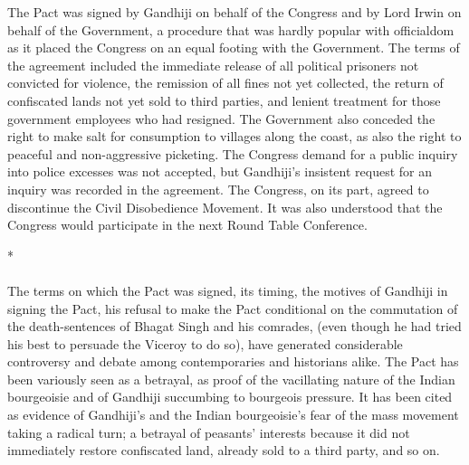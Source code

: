 \begin{multicols}{2}
The Pact was signed by Gandhiji on behalf of the Congress and by Lord Irwin on behalf of the Government, a procedure that was hardly popular with officialdom as it placed the Congress on an equal footing with the Government. The terms of the agreement included the immediate release of all political prisoners not convicted for violence, the remission of all fines not yet collected, the return of confiscated lands not yet sold to third parties, and lenient treatment for those government employees who had resigned. The Government also conceded the right to make salt for consumption to villages along the coast, as also the right to peaceful and non-aggressive picketing. The Congress demand for a public inquiry into police excesses was not accepted, but Gandhiji's insistent request for an inquiry was recorded in the agreement. The Congress, on its part, agreed to discontinue the Civil Disobedience Movement. It was also understood that the Congress would participate in the next Round Table Conference.

\begin{center}*\end{center}

\paragraph*{}

The terms on which the Pact was signed, its timing, the motives of Gandhiji in signing the Pact, his refusal to make the Pact conditional on the commutation of the death-sentences of Bhagat Singh and his comrades, (even though he had tried his best to persuade the Viceroy to do so), have generated considerable controversy and debate among contemporaries and historians alike. The Pact has been variously seen as a betrayal, as proof of the vacillating nature of the Indian bourgeoisie and of Gandhiji succumbing to bourgeois pressure. It has been cited as evidence of Gandhiji's and the Indian bourgeoisie's fear of the mass movement taking a radical turn; a betrayal of peasants' interests because it did not immediately restore confiscated land, already sold to a third party, and so on.


\end{multicols}
